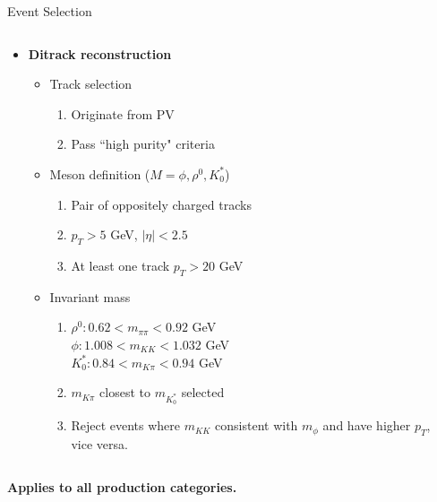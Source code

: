 \documentclass[9pt,aspectratio=1610]{beamer}
\newcommand{\khl}[1]{\textbf{\color{structure}#1}}
\begin{document}
\begin{frame}{Event Selection}
	\begin{columns}
		\begin{column}{0.5\textwidth}
			\begin{itemize}
				\item \khl{Ditrack reconstruction}\\
				\begin{itemize}
					\item Track selection
					\begin{enumerate}
						\item Originate from PV
						\item Pass ``high purity" criteria
					\end{enumerate}
					\item Meson definition (\(M=\phi, \rho^0, K^*_0\))
					\begin{enumerate}
						\item Pair of oppositely charged tracks
						\item \(p_T > 5\) GeV, \(|\eta| < 2.5\)
						\item At least one track \(p_T > 20\) GeV
					\end{enumerate}
					\item Invariant mass
					\begin{enumerate}
						\item \(\rho^0: 0.62 < m_{\pi\pi} < 0.92\) GeV\\
						\(\phi: 1.008 < m_{KK} < 1.032\) GeV\\
						\(K^*_0: 0.84 < m_{K\pi} < 0.94\) GeV
						\item \(m_{K\pi}\) closest to \(m_{K^*_0}\) selected
						\item Reject events where \(m_{KK}\) consistent with \(m_{\phi}\) and have higher \(p_T\), vice versa.
					\end{enumerate}
				\end{itemize}
			\end{itemize}
		\end{column}
		\begin{column}{0.35\textwidth}
		\end{column}
	\end{columns}
	\vspace{1em}
	\begin{center}
		\khl{Applies to all production categories.}
	\end{center}
\end{frame}
\end{document}
